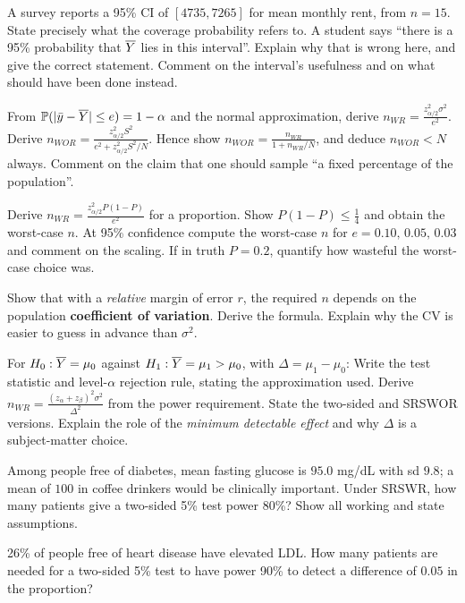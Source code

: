 A survey reports a 95\% CI of $[4735,7265]$ for mean monthly rent, from $n=15$.
 State precisely what the coverage probability refers to.
 A student says ``there is a 95\% probability that $\overline{Y}$ lies in this interval''. Explain
why that is wrong here, and give the correct statement.
 Comment on the interval's usefulness and on what should have been done instead.

 From $\mathbb{P}(|\bar{y}-\overline{Y}|\le e)=1-\alpha$ and the normal approximation, derive
$n_{WR}=\frac{z^2_{\alpha/2}\sigma^2}{e^2}$.
 Derive $n_{WOR}=\frac{z^2_{\alpha/2}S^2}{e^2+z^2_{\alpha/2}S^2/N}$.
 Hence show $n_{WOR}=\frac{n_{WR}}{1+n_{WR}/N}$, and deduce $n_{WOR}<N$ always.
 Comment on the claim that one should sample ``a fixed percentage of the population''.

 Derive $n_{WR}=\frac{z^2_{\alpha/2}P(1-P)}{e^2}$ for a proportion.
 Show $P(1-P)\le\frac14$ and obtain the worst-case $n$.
 At 95\% confidence compute the worst-case $n$ for $e=0.10,\,0.05,\,0.03$ and comment on
the scaling.
 If in truth $P=0.2$, quantify how wasteful the worst-case choice was.

 Show that with a \emph{relative} margin of error $r$, the required $n$ depends on the
population \textbf{coefficient of variation}. Derive the formula.
 Explain why the CV is easier to guess in advance than $\sigma^2$.

For $H_0:\overline{Y}=\mu_0$ against $H_1:\overline{Y}=\mu_1>\mu_0$, with $\Delta=\mu_1-\mu_0$:
 Write the test statistic and level-$\alpha$ rejection rule, stating the approximation used.
 Derive $n_{WR}=\frac{(z_\alpha+z_\beta)^2\sigma^2}{\Delta^2}$ from the power requirement.
 State the two-sided and SRSWOR versions.
 Explain the role of the \emph{minimum detectable effect} and why $\Delta$ is a
subject-matter choice.

Among people free of diabetes, mean fasting glucose is $95.0$ mg/dL with sd $9.8$; a mean of
$100$ in coffee drinkers would be clinically important. Under SRSWR, how many patients give a
two-sided 5\% test power 80\%? Show all working and state assumptions.

26\% of people free of heart disease have elevated LDL. How many patients are needed for a
two-sided 5\% test to have power 90\% to detect a difference of $0.05$ in the proportion?

